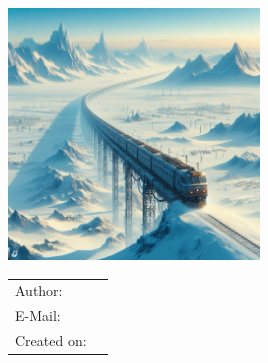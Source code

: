 \begin{titlepage}
	\sffamily

	\vspace{2.5cm}

	\begin{center}
		\includegraphics[width=0.5\textwidth]{images/title.jpg}

		\huge{\thesistitle}

		\Large{\thesistype}

		\large
		\thesistypedesc
	\end{center}

	\vspace{1.5cm}
	\begin{table}[htpb]
		\centering
		\begin{tabular}{ll}
			\\
			Author: & \thesisauthorname \\
			E-Mail: & \thesisauthoremail \\
			Created on: & \thesisdate \\
		\end{tabular}
	\end{table}

	\rmfamily
\end{titlepage}
